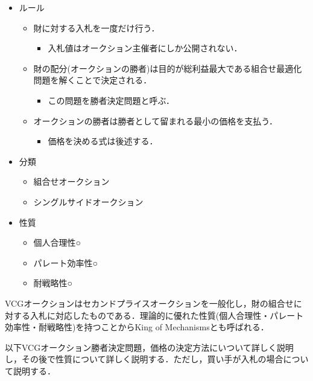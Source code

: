 \begin{itemize}
\tightlist
\item
  ルール

  \begin{itemize}
  \tightlist
  \item
    財に対する入札を一度だけ行う．

    \begin{itemize}
    \tightlist
    \item
      入札値はオークション主催者にしか公開されない．
    \end{itemize}
  \item
    財の配分(オークションの勝者)は目的が総利益最大である組合せ最適化問題を解くことで決定される．

    \begin{itemize}
    \tightlist
    \item
      この問題を勝者決定問題と呼ぶ．
    \end{itemize}
  \item
    オークションの勝者は勝者として留まれる最小の価格を支払う．

    \begin{itemize}
    \tightlist
    \item
      価格を決める式は後述する．
    \end{itemize}
  \end{itemize}
\item
  分類

  \begin{itemize}
  \tightlist
  \item
    組合せオークション
  \item
    シングルサイドオークション
  \end{itemize}
\item
  性質

  \begin{itemize}
  \tightlist
  \item
    個人合理性○
  \item
    パレート効率性○
  \item
    耐戦略性○
  \end{itemize}
\end{itemize}

VCGオークションはセカンドプライスオークションを一般化し，財の組合せに対する入札に対応したものである．理論的に優れた性質(個人合理性・パレート効率性・耐戦略性)を持つことからKing
of Mechanismsとも呼ばれる．

以下VCGオークション勝者決定問題，価格の決定方法にいついて詳しく説明し，その後で性質について詳しく説明する．ただし，買い手が入札の場合について説明する．

